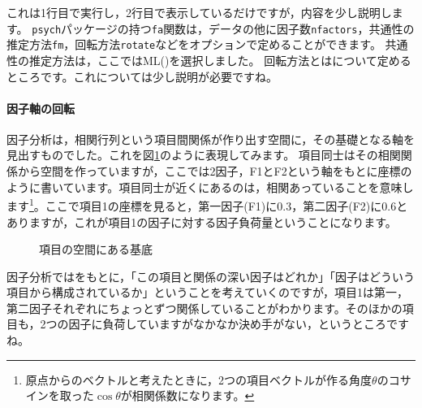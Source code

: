 \documentclass{ltjsbook}
\begin{document}
これは1行目で実行し，2行目で表示しているだけですが，内容を少し説明します。
\texttt{psych}パッケージの持つ\texttt{fa}関数は，データの他に因子数\texttt{nfactors}，共通性の推定方法\texttt{fm}，回転方法\texttt{rotate}などをオプションで定めることができます。
共通性の推定方法は，ここではML()を選択しました。
回転方法とはについて定めるところです。これについては少し説明が必要ですね。

\paragraph{因子軸の回転}
因子分析は，相関行列という項目間関係が作り出す空間に，その基礎となる軸を見出すものでした。これを図\ref{fig::x10_FAcoord1}のように表現してみます。
項目同士はその相関関係から空間を作っていますが，ここでは2因子，F1とF2という軸をもとに座標のように書いています。項目同士が近くにあるのは，相関あっていることを意味します\footnote{原点からのベクトルと考えたときに，2つの項目ベクトルが作る角度$\theta$のコサインを取った$\cos \theta$が相関係数になります。}。ここで項目1の座標を見ると，第一因子(F1)に0.3，第二因子(F2)に0.6とありますが，これが項目1の因子に対する因子負荷量ということになります。
\begin{figure}[ht]
	\centering
	\caption{項目の空間にある基底}
	\label{fig::x10_FAcoord1}
\end{figure}

因子分析ではをもとに，「この項目と関係の深い因子はどれか」「因子はどういう項目から構成されているか」ということを考えていくのですが，項目1は第一，第二因子それぞれにちょっとずつ関係していることがわかります。そのほかの項目も，2つの因子に負荷していますがなかなか決め手がない，というところですね。
\end{document}
